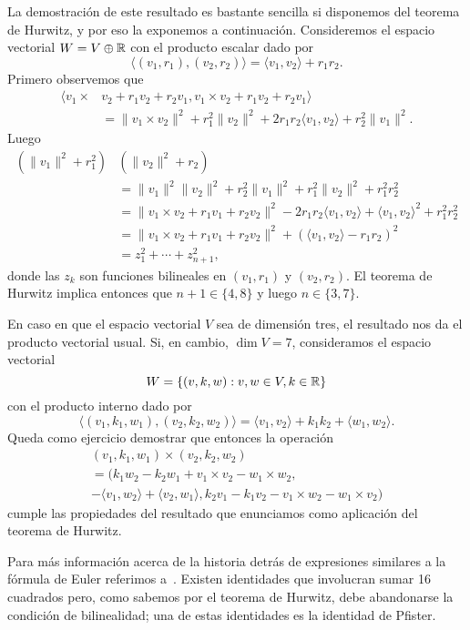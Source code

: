 La demostración de este resultado es bastante sencilla si disponemos del
teorema de Hurwitz, y por eso la exponemos a continuación.  Consideremos el espacio vectorial $W=V\oplus\mathbb{R}$
con el producto escalar dado por 
\[
	\langle (v_1,r_1),(v_2,r_2)\rangle = \langle v_1,v_2\rangle+r_1r_2.
\]
Primero observemos que
\begin{align*}
\langle v_1\times &v_2+r_1v_2+r_2v_1,v_1\times v_2+r_1v_2+r_2v_1\rangle\\
&=\|v_1\times v_2\|^2+r_1^2\|v_2\|^2+2r_1r_2\langle v_1,v_2\rangle+r_2^2\|v_1\|^2.
\end{align*}
Luego 
\begin{align*}
(\|v_1\|^2+r_1^2)&(\|v_2\|^2+r_2)\\
&= \|v_1\|^2\|v_2\|^2+r_2^2\|v_1\|^2+r_1^2\|v_2\|^2+r_1^2r_2^2\\
&=\|v_1\times v_2+r_1v_1+r_2v_2\|^2-2r_1r_2\langle v_1,v_2\rangle+\langle v_1,v_2\rangle^2+r_1^2r_2^2\\
&=\|v_1\times v_2+r_1v_1+r_2v_2\|^2+(\langle v_1,v_2\rangle-r_1r_2)^2\\
&=z_1^2+\cdots+z_{n+1}^2,
\end{align*}
donde las $z_k$ son funciones bilineales en $(v_1,r_1)$ y $(v_2,r_2)$. El
teorema de Hurwitz implica entonces que $n+1\in\{4,8\}$ y luego $n\in\{3,7\}$.

En caso en que el espacio vectorial $V$ sea de dimensión tres, el resultado nos
da el producto vectorial usual. Si, en cambio, $\dim V=7$, consideramos el
espacio vectorial 
\[
        W=\{(v,k,w):v,w\in V,k\in\mathbb{R}\}
\]
con el producto interno dado por
\[
        \langle (v_1,k_1,w_1),(v_2,k_2,w_2)\rangle = \langle v_1,v_2\rangle+k_1k_2+\langle w_1,w_2\rangle.
\]
Queda como ejercicio demostrar que entonces la operación 
\begin{multline*}
        (v_1,k_1,w_1)\times (v_2,k_2,w_2)\\
        =(k_1w_2-k_2w_1+v_1\times v_2-w_1\times w_2,
        \\-\langle v_1,w_2\rangle+\langle v_2,w_1\rangle, 
        k_2v_1-k_1v_2-v_1\times w_2-w_1\times v_2)
\end{multline*}
cumple las propiedades del resultado que enunciamos como aplicación del teorema
de Hurwitz. 


Para más información acerca de la historia detrás de expresiones similares a la
fórmula de Euler referimos a~\cite{MR1502549,MR1502566}.  Existen identidades
que involucran sumar 16 cuadrados pero, como sabemos por el teorema de Hurwitz,
debe abandonarse la condición de bilinealidad; una de estas identidades es la
identidad de Pfister. 


